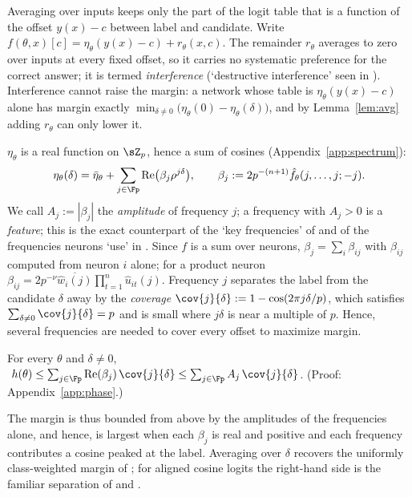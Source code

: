Averaging over inputs keeps only the part of the logit table that is a function of the offset $y(x)-c$ between label and candidate. Write $f(\theta,x)[c]=\eta_\theta(y(x)-c)+r_\theta(x,c)$. The remainder $r_\theta$ averages to zero over inputs at every fixed offset, so it carries no systematic preference for the correct answer; it is termed \emph{interference} (`destructive interference' seen in \citealp{gromov2023grokking}). Interference cannot raise the margin: a network whose table is $\eta_\theta(y(x)-c)$ alone has margin exactly $\min_{\delta\neq0}\big(\eta_\theta(0)-\eta_\theta(\delta)\big)$, and by Lemma~\ref{lem:avg} adding $r_\theta$ can only lower it.

$\eta_\theta$ is a real function on $\sZ_p$, hence a sum of cosines (Appendix~\ref{app:spectrum}):
\begin{equation}
  \eta_\theta(\delta)=\bar\eta_\theta+\sum_{j\in\Fp}\mathrm{Re}\big(\beta_j\rho^{j\delta}\big),\qquad\beta_j:=2p^{-(n+1)}\hat f_\theta(j,\dots,j;-j).
  \label{eq:spectrum}
\end{equation}
We call $A_j:=|\beta_j|$ the \emph{amplitude} of frequency $j$; a frequency with $A_j>0$ is a \emph{feature}; this is the exact counterpart of the `key frequencies' of \citet{nanda2023progress} and of the frequencies neurons `use' in \citet{morwani2024feature}. Since $f$ is a sum over neurons, $\beta_j=\sum_i\beta_{ij}$ with $\beta_{ij}$ computed from neuron $i$ alone; for a product neuron $\beta_{ij}=2p^{-\nu}\overline{\hat w_i(j)}\prod_{t=1}^{n}\hat u_{it}(j)$. Frequency $j$ separates the label from the candidate $\delta$ away by the \emph{coverage} $\cov{j}{\delta}:=1-\cos(2\pi j\delta/p)$, which satisfies $\sum_{\delta\neq0}\cov{j}{\delta}=p$ and is small where $j\delta$ is near a multiple of $p$. Hence, several frequencies are needed to cover every offset to maximize margin.

\begin{lemma}\label{lem:phase}
For every $\theta$ and $\delta\neq0$, $\ h(\theta)\le\sum_{j\in\Fp}\mathrm{Re}(\beta_j)\,\cov{j}{\delta}\le\sum_{j\in\Fp}A_j\,\cov{j}{\delta}$. (Proof: Appendix~\ref{app:phase}.)
\end{lemma}

The margin is thus bounded from above by the amplitudes of the frequencies alone, and hence, is largest when each $\beta_j$ is real and positive and each frequency contributes a cosine peaked at the label. Averaging over $\delta$ recovers the uniformly class-weighted margin of \citet[App.~F.1]{morwani2024feature}; for aligned cosine logits the right-hand side is the familiar separation of \citet[Sec.~4.2]{nanda2023progress} and \citet[Thm.~4.7]{mccracken2025}.


